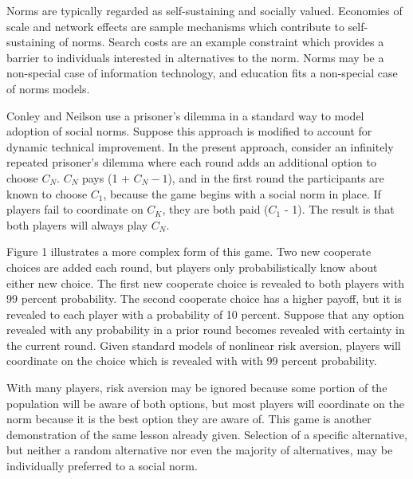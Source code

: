 \documentclass[AER]{./aea-latex-templates/AEA}
\begin{document}
        Norms are typically regarded as self-sustaining and socially
        valued\cite{dequech2006institutions}. Economies of scale and
        network effects are sample mechanisms which contribute to
        self-sustaining of norms. Search costs are an example constraint
        which provides a barrier to individuals interested in alternatives
        to the norm. Norms may be a non-special case of
        information technology, and education fits a non-special case of norms models.
        
        Conley and Neilson use a prisoner’s dilemma in a standard way to model adoption
        of social norms\cite{conley2009endogenous}. Suppose this approach is modified
        to account for dynamic technical improvement. In the present
        approach, consider an infinitely repeated prisoner’s dilemma where each
        round adds an additional option to choose $C_N$. $C_N$ pays
        (1 + $C_N-1$), and in the first round the participants are known to
        choose $C_1$, because the game begins with a social norm in place.
        If players fail to coordinate on $C_K$, they are both paid ($C_1$ - 1).
        The result is that both players will always play $C_N$.
        
        Figure 1 illustrates a more complex form of this game. Two new cooperate
        choices are added each round, but
        players only probabilistically know about either new choice. The first new cooperate choice is
        revealed to both players with 99 percent probability. The second cooperate
        choice has a higher payoff, but it is revealed to
        each player with a probability of 10 percent. Suppose that any option
        revealed with any probability in a prior round becomes revealed with certainty in the current round. Given standard models of nonlinear
        risk aversion, players will coordinate on the choice which is revealed
        with with 99 percent probability.
        
        With many players, risk aversion may be ignored because
        some portion of the population will be aware of both options, but most
        players will coordinate on the norm because it is the best option they are aware of.
        This game is another demonstration of the same lesson already given. Selection of
        a specific alternative, but neither a random alternative nor even the majority of
        alternatives, may be individually preferred to a social norm.
        
\end{document}
